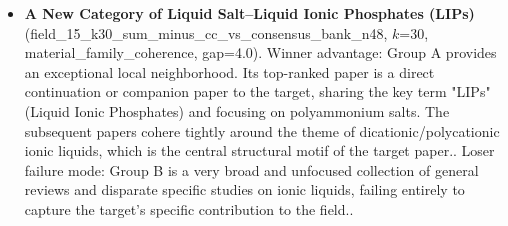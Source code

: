 \begin{itemize}
\item \textbf{A New Category of Liquid Salt--Liquid Ionic Phosphates (LIPs)} (field\_15\_k30\_sum\_minus\_cc\_vs\_consensus\_bank\_n48, $k$=30, material\_family\_coherence, gap=4.0). Winner advantage: Group A provides an exceptional local neighborhood. Its top-ranked paper is a direct continuation or companion paper to the target, sharing the key term "LIPs" (Liquid Ionic Phosphates) and focusing on polyammonium salts. The subsequent papers cohere tightly around the theme of dicationic/polycationic ionic liquids, which is the central structural motif of the target paper.. Loser failure mode: Group B is a very broad and unfocused collection of general reviews and disparate specific studies on ionic liquids, failing entirely to capture the target's specific contribution to the field..
\end{itemize}
